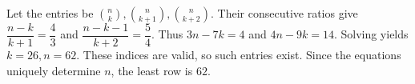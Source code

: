 Let the entries be $\binom nk,\binom n{k+1},\binom n{k+2}$. Their consecutive ratios give $\dfrac{n-k}{k+1}=\dfrac{4}{3}$ and $\dfrac{n-k-1}{k+2}=\dfrac{5}{4}$. Thus $3n-7k=4$ and $4n-9k=14$. Solving yields $k=26,n=62$. These indices are valid, so such entries exist. Since the equations uniquely determine $n$, the least row is $\boxed{62}$.
